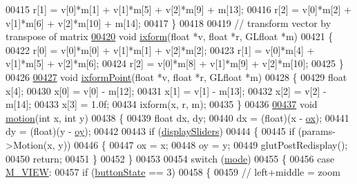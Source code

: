 \begin{DoxyCode}
{{{00415     r[1] = v[0]*m[1] + v[1]*m[5] + v[2]*m[9] + m[13];
00416     r[2] = v[0]*m[2] + v[1]*m[6] + v[2]*m[10] + m[14];
00417 \}
00418 
00419 \textcolor{comment}{// transform vector by transpose of matrix}
\hypertarget{particles_8cpp_source_l00420}{}\hyperlink{particles_8cpp_aa22b13a9b9cf40b19f9c1c09603862c8}{00420} \textcolor{keywordtype}{void} \hyperlink{particles_8cpp_aa22b13a9b9cf40b19f9c1c09603862c8}{ixform}(\textcolor{keywordtype}{float} *v, \textcolor{keywordtype}{float} *r, GLfloat *m)
00421 \{
00422     r[0] = v[0]*m[0] + v[1]*m[1] + v[2]*m[2];
00423     r[1] = v[0]*m[4] + v[1]*m[5] + v[2]*m[6];
00424     r[2] = v[0]*m[8] + v[1]*m[9] + v[2]*m[10];
00425 \}
00426 
\hypertarget{particles_8cpp_source_l00427}{}\hyperlink{particles_8cpp_a9b3bc33348ec5b4dbb049f91362459b8}{00427} \textcolor{keywordtype}{void} \hyperlink{particles_8cpp_a9b3bc33348ec5b4dbb049f91362459b8}{ixformPoint}(\textcolor{keywordtype}{float} *v, \textcolor{keywordtype}{float} *r, GLfloat *m)
00428 \{
00429     \textcolor{keywordtype}{float} x[4];
00430     x[0] = v[0] - m[12];
00431     x[1] = v[1] - m[13];
00432     x[2] = v[2] - m[14];
00433     x[3] = 1.0f;
00434     ixform(x, r, m);
00435 \}
00436 
\hypertarget{particles_8cpp_source_l00437}{}\hyperlink{particles_8cpp_a45a7d7c86c97ca6a2d4d32ce2d263f67}{00437} \textcolor{keywordtype}{void} \hyperlink{particles_8cpp_a45a7d7c86c97ca6a2d4d32ce2d263f67}{motion}(\textcolor{keywordtype}{int} x, \textcolor{keywordtype}{int} y)
00438 \{
00439     \textcolor{keywordtype}{float} dx, dy;
00440     dx = (\textcolor{keywordtype}{float})(x - \hyperlink{particles_8cpp_afef635ed3c73fc60d8faf6dd610c4298}{ox});
00441     dy = (\textcolor{keywordtype}{float})(y - \hyperlink{particles_8cpp_a791e26888be6777cd5c5d0c736a06821}{oy});
00442 
00443     \textcolor{keywordflow}{if} (\hyperlink{particles_8cpp_ac345a677e529047cf89d33fc26f10fe7}{displaySliders})
00444     \{
00445         \textcolor{keywordflow}{if} (params->Motion(x, y))
00446         \{
00447             ox = x;
00448             oy = y;
00449             glutPostRedisplay();
00450             \textcolor{keywordflow}{return};
00451         \}
00452     \}
00453 
00454     \textcolor{keywordflow}{switch} (\hyperlink{particles_8cpp_a1ea5d0cb93f22f7d0fdf804bd68c3326}{mode})
00455     \{
00456         \textcolor{keywordflow}{case} \hyperlink{particles_8cpp_a06fc87d81c62e9abb8790b6e5713c55ba04727eefdf62663010249dd6d065d37a}{M\_VIEW}:
00457             \textcolor{keywordflow}{if} (\hyperlink{particles_8cpp_a5002611f83f5a861df12917dd5651db8}{buttonState} == 3)
00458             \{
00459                 \textcolor{comment}{// left+middle = zoom}
}}}
\end{DoxyCode}
